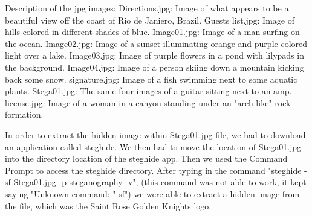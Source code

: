 \documentclass[12ptletterpaper]{paper}
\newcommand\tab[1][1cm]{\hspace*{#1}}
\begin{document}
\begin{flushleft}
Description of the jpg images:
		\tab Directions.jpg: Image of what appears to be a beautiful view off the coast of Rio de Janiero, Brazil.
		\tab Guests list.jpg: Image of hills colored in different shades of blue.
		\tab Image01.jpg: Image of a man surfing on the ocean.
		\tab Image02.jpg: Image of a sunset illuminating orange and purple colored light over a lake.
		\tab Image03.jpg: Image of purple flowers in a pond with lilypads in the background.
		\tab Image04.jpg: Image of a person skiing down a mountain kicking back some snow.
		\tab signature.jpg: Image of a fish swimming next to some aquatic plants.
		\tab Stega01.jpg: The same four images of a guitar sitting next to an amp.
		\tab license.jpg: Image of a woman in a canyon standing under an "arch-like" rock formation.
		
		
		\tab In order to extract the hidden image within Stega01.jpg file, we had to download an application called steghide. We then had to move the location of Stega01.jpg into the directory location of the steghide app. Then we used the Command Prompt to access the steghide directory. After typing in the command "steghide -sf Stega01.jpg -p steganography -v", (this command was not able to work, it kept saying "Unknown command: "-sf") we were able to extract a hidden image from the file, which was the Saint Rose Golden Knights logo.\\
		
		
	\end{flushleft}	
\end{document}
